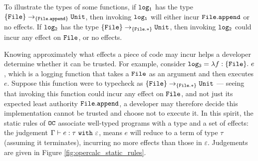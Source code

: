 To illustrate the types of some functions, if $\mathtt{log_1}$ has the type $\{ \mathtt{File} \} \rightarrow_{\{\mathtt{File.append}\}} \mathtt{Unit}$, then invoking $\mathtt{log_1}$ will either incur $\mathtt{File.append}$ or no effects. If $\mathtt{log_2}$ has the type $\{ \mathtt{File} \} \rightarrow_{\{\mathtt{File.*}\}} \mathtt{Unit}$, then invoking $\mathtt{log_2}$ could incur any effect on $\mathtt{File}$, or no effects.

Knowing approximately what effects a piece of code may incur helps a developer determine whether it can be trusted. For example, consider $\mathtt{log_3} = \lambda f: \{ \mathtt{File} \}.~e$, which is a logging function that takes a $\mathtt{File}$ as an argument and then executes $e$. Suppose this function were to typecheck as $\{ \mathtt{File} \} \rightarrow_{\{ \mathtt{File.*} \}} \mathtt{Unit}$ --- seeing that invoking this function could incur any effect on $\mathtt{File}$, and not just its expected least authority $\mathtt{File.append}$, a developer may therefore decide this implementation cannot be trusted and choose not to execute it. In this spirit, the static rules of $\mathtt{OC}$ associate well-typed programs with a type and a set of effects: the judgement $\Gamma \vdash e: \tau~\mathtt{with}~ \varepsilon$, means $e$ will reduce to a term of type $\tau$ (assuming it terminates), incurring no more effects than those in $\varepsilon$. Judgements are given in Figure \ref{fig:opercalc_static_rules}.

